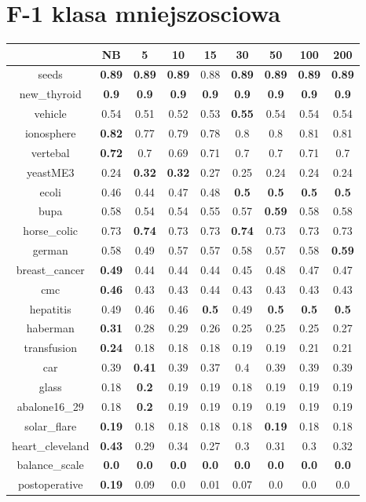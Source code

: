 \documentclass{article}%
\begin{document}
%
\section*{F{-}1 klasa mniejszosciowa}%
\begin{tabular}{c|cccccccc}%
\hline%
&NB&5&10&15&30&50&100&200\\%
\hline%
seeds&\textbf{0.89}&\textbf{0.89}&\textbf{0.89}&0.88&\textbf{0.89}&\textbf{0.89}&\textbf{0.89}&\textbf{0.89}\\%
new\_thyroid&\textbf{0.9}&\textbf{0.9}&\textbf{0.9}&\textbf{0.9}&\textbf{0.9}&\textbf{0.9}&\textbf{0.9}&\textbf{0.9}\\%
vehicle&0.54&0.51&0.52&0.53&\textbf{0.55}&0.54&0.54&0.54\\%
ionosphere&\textbf{0.82}&0.77&0.79&0.78&0.8&0.8&0.81&0.81\\%
vertebal&\textbf{0.72}&0.7&0.69&0.71&0.7&0.7&0.71&0.7\\%
yeastME3&0.24&\textbf{0.32}&\textbf{0.32}&0.27&0.25&0.24&0.24&0.24\\%
ecoli&0.46&0.44&0.47&0.48&\textbf{0.5}&\textbf{0.5}&\textbf{0.5}&\textbf{0.5}\\%
bupa&0.58&0.54&0.54&0.55&0.57&\textbf{0.59}&0.58&0.58\\%
horse\_colic&0.73&\textbf{0.74}&0.73&0.73&\textbf{0.74}&0.73&0.73&0.73\\%
german&0.58&0.49&0.57&0.57&0.58&0.57&0.58&\textbf{0.59}\\%
breast\_cancer&\textbf{0.49}&0.44&0.44&0.44&0.45&0.48&0.47&0.47\\%
cmc&\textbf{0.46}&0.43&0.43&0.44&0.43&0.43&0.43&0.43\\%
hepatitis&0.49&0.46&0.46&\textbf{0.5}&0.49&\textbf{0.5}&\textbf{0.5}&\textbf{0.5}\\%
haberman&\textbf{0.31}&0.28&0.29&0.26&0.25&0.25&0.25&0.27\\%
transfusion&\textbf{0.24}&0.18&0.18&0.18&0.19&0.19&0.21&0.21\\%
car&0.39&\textbf{0.41}&0.39&0.37&0.4&0.39&0.39&0.39\\%
glass&0.18&\textbf{0.2}&0.19&0.19&0.18&0.19&0.19&0.19\\%
abalone16\_29&0.18&\textbf{0.2}&0.19&0.19&0.19&0.19&0.19&0.19\\%
solar\_flare&\textbf{0.19}&0.18&0.18&0.18&0.18&\textbf{0.19}&0.18&0.18\\%
heart\_cleveland&\textbf{0.43}&0.29&0.34&0.27&0.3&0.31&0.3&0.32\\%
balance\_scale&\textbf{0.0}&\textbf{0.0}&\textbf{0.0}&\textbf{0.0}&\textbf{0.0}&\textbf{0.0}&\textbf{0.0}&\textbf{0.0}\\%
postoperative&\textbf{0.19}&0.09&0.0&0.01&0.07&0.0&0.0&0.0\\%
\end{tabular}
\end{document}
